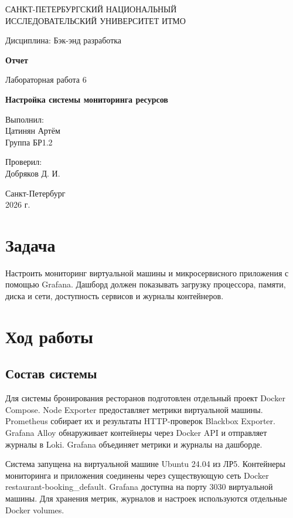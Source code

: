 \documentclass[14pt,a4paper]{extarticle}
\begin{document}
\begin{titlepage}\begin{center}
САНКТ-ПЕТЕРБУРГСКИЙ НАЦИОНАЛЬНЫЙ\\ ИССЛЕДОВАТЕЛЬСКИЙ УНИВЕРСИТЕТ ИТМО
\vspace{1.5cm}

Дисциплина: Бэк-энд разработка
\vspace{1.5cm}

\textbf{Отчет}
\vspace{0.5cm}

Лабораторная работа 6
\vspace{0.5cm}

\textbf{Настройка системы мониторинга ресурсов}
\vfill
\begin{flushright}Выполнил:\\ Цатинян Артём\\ Группа БР1.2
\vspace{0.8cm}

Проверил:\\ Добряков Д. И.\end{flushright}
\vfill Санкт-Петербург\\ 2026 г.
\end{center}\end{titlepage}
\section{Задача}
Настроить мониторинг виртуальной машины и микросервисного приложения с помощью Grafana. Дашборд должен показывать загрузку процессора, памяти, диска и сети, доступность сервисов и журналы контейнеров.
\section{Ход работы}
\subsection{Состав системы}
Для системы бронирования ресторанов подготовлен отдельный проект Docker Compose. Node Exporter предоставляет метрики виртуальной машины. Prometheus собирает их и результаты HTTP-проверок Blackbox Exporter. Grafana Alloy обнаруживает контейнеры через Docker API и отправляет журналы в Loki. Grafana объединяет метрики и журналы на дашборде.

Система запущена на виртуальной машине Ubuntu 24.04 из ЛР5. Контейнеры мониторинга и приложения соединены через существующую сеть Docker restaurant-booking\_default. Grafana доступна на порту 3030 виртуальной машины. Для хранения метрик, журналов и настроек используются отдельные Docker volumes.
\end{document}
